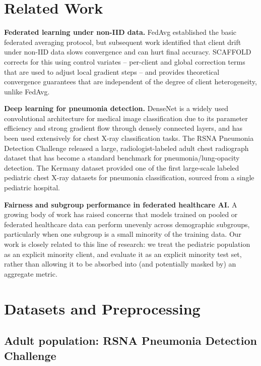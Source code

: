 \documentclass[conference]{IEEEtran}
\begin{document}
\section{Related Work}

\textbf{Federated learning under non-IID data.} FedAvg \cite{mcmahan2017fedavg}
established the basic federated averaging protocol, but subsequent work
identified that client drift under non-IID data slows convergence and can
hurt final accuracy. SCAFFOLD \cite{karimireddy2020scaffold} corrects for
this using control variates -- per-client and global correction terms that
are used to adjust local gradient steps -- and provides theoretical
convergence guarantees that are independent of the degree of client
heterogeneity, unlike FedAvg.

\textbf{Deep learning for pneumonia detection.} DenseNet
\cite{huang2017densenet} is a widely used convolutional architecture for
medical image classification due to its parameter efficiency and strong
gradient flow through densely connected layers, and has been used
extensively for chest X-ray classification tasks. The RSNA Pneumonia
Detection Challenge \cite{rsna2019} released a large, radiologist-labeled
adult chest radiograph dataset that has become a standard benchmark for
pneumonia/lung-opacity detection. The Kermany dataset
\cite{kermany2018cell} provided one of the first large-scale labeled
pediatric chest X-ray datasets for pneumonia classification, sourced from a
single pediatric hospital.

\textbf{Fairness and subgroup performance in federated healthcare AI.} A
growing body of work has raised concerns that models trained on pooled or
federated healthcare data can perform unevenly across demographic
subgroups, particularly when one subgroup is a small minority of the
training data. Our work is closely related to this line of research: we
treat the pediatric population as an explicit minority client, and evaluate
it as an explicit minority test set, rather than allowing it to be absorbed
into (and potentially masked by) an aggregate metric.

\section{Datasets and Preprocessing}

\subsection{Adult population: RSNA Pneumonia Detection Challenge}
\end{document}
